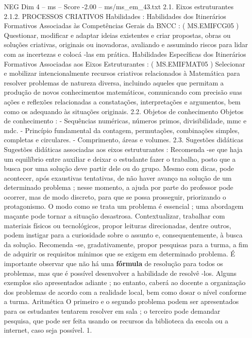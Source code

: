 \begin{textsample}{NEG Dim 4 – ms – Score -2.00 – ms/ms\_em\_43.txt}  \label{ex:f4_neg_134}
2.1.
Eixos estruturantes 2.1.2.
PROCESSOS CRIATIVOS Habilidades : Habilidades dos Itinerários Formativos Associadas às Competências Gerais da BNCC : ( MS.EMIFCG05 ) Questionar, modificar e adaptar ideias existentes e criar propostas, obras ou soluções criativas, originais ou inovadoras, avaliando e assumindo riscos para lidar com as incertezas e colocá -las em prática.
Habilidades Específicas dos Itinerários Formativos Associadas aos Eixos Estruturantes : ( MS.EMIFMAT05 ) Selecionar e mobilizar intencionalmente recursos criativos relacionados à Matemática para resolver problemas de natureza diversa, incluindo aqueles que permitam a produção de novos conhecimentos matemáticos, comunicando com precisão suas ações e reflexões relacionadas a constatações, interpretações e argumentos, bem como os adequando às situações originais. 2.2.
Objetos de conhecimento Objetos de conhecimento : - Sequências numéricas, números primos, divisibilidade, mmc e mdc. - Princípio fundamental da contagem, permutações, combinações simples, completas e circulares. - Comprimento, áreas e volumes. 2.3.
Sugestões didáticas Sugestões didáticas associadas aos eixos estruturantes : Recomenda -se que haja um equilíbrio entre auxiliar e deixar o estudante fazer o trabalho, posto que a busca por uma solução deve partir dele ou do grupo.
Mesmo com dicas, pode acontecer, após exaustivas tentativas, de não haver avanço na solução de um determinado problema ; nesse momento, a ajuda por parte do professor pode ocorrer, mas de modo discreto, para que se possa prosseguir, priorizando o protagonismo.
O modo como se trata um problema é essencial ; uma abordagem maçante pode tornar a situação desastrosa.
Contextualizar, trabalhar com materiais físicos ou tecnológicos, propor leituras direcionadas, dentre outros, podem instigar para a curiosidade sobre o assunto e, consequentemente, à busca da solução.
Recomenda -se, gradativamente, propor pesquisas para a turma, a fim de adquirir os requisitos mínimos que se exigem em determinado problema.
É importante observar que não há uma \textbf{fórmula} de resolução para todos os problemas, mas que é possível desenvolver a habilidade de resolvê -los.
Alguns exemplos são apresentados adiante ; no entanto, caberá ao docente a organização dos problemas de acordo com a realidade local, bem como dosar o nível conforme a turma.
Aritmética O primeiro e o segundo problema podem ser apresentados para os estudantes tentarem resolver em sala ; o terceiro pode demandar pesquisa, que pode ser feita usando os recursos da biblioteca da escola ou a internet, caso seja possível. 1.

\end{textsample}
